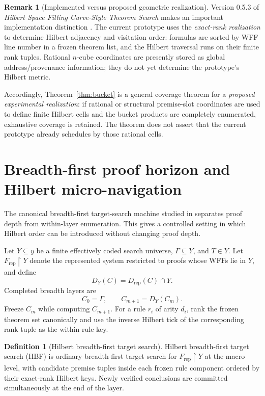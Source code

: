 \documentclass[11pt]{article}
\theoremstyle{definition}
\newtheorem{definition}[theorem]{Definition}
\newtheorem{remark}[theorem]{Remark}
\begin{document}
\begin{remark}[Implemented versus proposed geometric realization]\label{rem:implemented-proposed}
Version 0.5.3 of \emph{Hilbert Space Filling Curve-Style Theorem Search} makes an important implementation distinction \cite{TennesonHilbertSearch}. The current prototype uses the \emph{exact-rank realization} to determine Hilbert adjacency and visitation order: formulas are sorted by WFF line number in a frozen theorem list, and the Hilbert traversal runs on their finite rank tuples. Rational $n$-cube coordinates are presently stored as global address/provenance information; they do not yet determine the prototype's Hilbert metric.

Accordingly, Theorem~\ref{thm:bucket} is a general coverage theorem for a \emph{proposed experimental realization}: if rational or structural premise-slot coordinates are used to define finite Hilbert cells and the bucket products are completely enumerated, exhaustive coverage is retained. The theorem does not assert that the current prototype already schedules by those rational cells.
\end{remark}

\section{Breadth-first proof horizon and Hilbert micro-navigation}

The canonical breadth-first target-search machine studied in \cite{TennesonDepths48} separates proof depth from within-layer enumeration. This gives a controlled setting in which Hilbert order can be introduced without changing proof depth.

Let $Y\subseteq y$ be a finite effectively coded search universe, $\Gamma\subseteq Y$, and $T\in Y$. Let $F_{\mathrm{rep}}\!\upharpoonright\!Y$ denote the represented system restricted to proofs whose WFFs lie in $Y$, and define
\[
D_Y(C)=D_{\mathrm{rep}}(C)\cap Y.
\]
Completed breadth layers are
\[
C_0=\Gamma,
\qquad
C_{m+1}=D_Y(C_m).
\]
Freeze $C_m$ while computing $C_{m+1}$. For a rule $r_i$ of arity $d_i$, rank the frozen theorem set canonically and use the inverse Hilbert tick of the corresponding rank tuple as the within-rule key.

\begin{definition}[Hilbert breadth-first target search]
Hilbert breadth-first target search (HBF) is ordinary breadth-first target search for $F_{\mathrm{rep}}\!\upharpoonright\!Y$ at the macro level, with candidate premise tuples inside each frozen rule component ordered by their exact-rank Hilbert keys. Newly verified conclusions are committed simultaneously at the end of the layer.
\end{definition}
\end{document}
